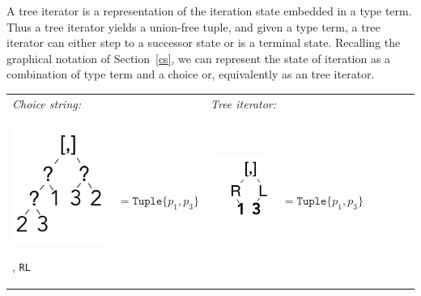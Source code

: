 \documentclass[a4paper,english]{lipics-v2019}
\newcommand{\xt}[1]{\texttt{#1}}
\renewcommand{\L}{{\tt L}\xspace}
\newcommand{\R}{{\tt R}\xspace}
\newcommand{\tuple}[1]{\xt{Tuple\{}#1\xt{\}}}
\begin{document}
A tree iterator is a representation of the iteration state embedded in a
type term. Thus a tree iterator yields a union-free tuple, and given a type
term, a tree iterator can either step to a successor state or is a terminal
state. Recalling the graphical notation of Section~\ref{cs}, we can
represent the state of iteration as a combination of type term and a choice
or, equivalently as an tree iterator.

\medskip
{\small
\begin{tabular}{@{}l@{~}ll@{~}ll@{~}ll@{~}l}
\it Choice string: &&  \multicolumn{2}{l}{\it Tree iterator:}\\[2mm]
\begin{minipage}{1.2cm}\includegraphics[scale=.25]{figures/tree1.pdf} 
\end{minipage} , \R\L & $ =   \tuple{p_1,p_3} $ 
&\begin{minipage}{1.2cm}\includegraphics[scale=.25]{figures/tree8.pdf}
\end{minipage}& $=\tuple{p_1,p_3}$
\end{tabular}}
\end{document}
